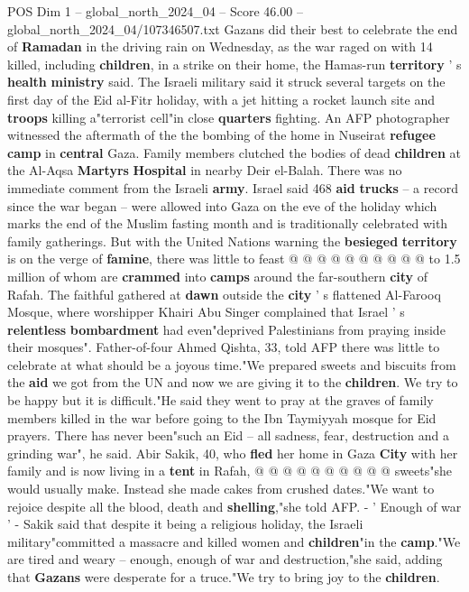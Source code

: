 \begin{textsample}{POS Dim 1 – global\_north\_2024\_04 – Score 46.00 – global\_north\_2024\_04/107346507.txt}  \label{ex:f1_pos_191}
Gazans did their best to celebrate the end of \textbf{Ramadan} in the driving rain on Wednesday, as the war raged on with 14 killed, including \textbf{children}, in a strike on their home, the Hamas-run \textbf{territory} ' s \textbf{health} \textbf{ministry} said.
The Israeli military said it struck several targets on the first day of the Eid al-Fitr holiday, with a jet hitting a rocket launch site and \textbf{troops} killing a"terrorist cell"in close \textbf{quarters} fighting.
An AFP photographer witnessed the aftermath of the the bombing of the home in Nuseirat \textbf{refugee} \textbf{camp} in \textbf{central} Gaza.
Family members clutched the bodies of dead \textbf{children} at the Al-Aqsa \textbf{Martyrs} \textbf{Hospital} in nearby Deir el-Balah.
There was no immediate comment from the Israeli \textbf{army}.
Israel said 468 \textbf{aid} \textbf{trucks} -- a record since the war began -- were allowed into Gaza on the eve of the holiday which marks the end of the Muslim fasting month and is traditionally celebrated with family gatherings.
But with the United Nations warning the \textbf{besieged} \textbf{territory} is on the verge of \textbf{famine}, there was little to feast @ @ @ @ @ @ @ @ @ @ to 1.5 million of whom are \textbf{crammed} into \textbf{camps} around the far-southern \textbf{city} of Rafah.
The faithful gathered at \textbf{dawn} outside the \textbf{city} ' s flattened Al-Farooq Mosque, where worshipper Khairi Abu Singer complained that Israel ' s \textbf{relentless} \textbf{bombardment} had even"deprived Palestinians from praying inside their mosques".
Father-of-four Ahmed Qishta, 33, told AFP there was little to celebrate at what should be a joyous time."We prepared sweets and biscuits from the \textbf{aid} we got from the UN and now we are giving it to the \textbf{children}.
We try to be happy but it is difficult."He said they went to pray at the graves of family members killed in the war before going to the Ibn Taymiyyah mosque for Eid prayers.
There has never been"such an Eid -- all sadness, fear, destruction and a grinding war", he said.
Abir Sakik, 40, who \textbf{fled} her home in Gaza \textbf{City} with her family and is now living in a \textbf{tent} in Rafah, @ @ @ @ @ @ @ @ @ @ sweets"she would usually make.
Instead she made cakes from crushed dates."We want to rejoice despite all the blood, death and \textbf{shelling},"she told AFP. - ' Enough of war ' - Sakik said that despite it being a religious holiday, the Israeli military"committed a massacre and killed women and \textbf{children}"in the \textbf{camp}."We are tired and weary -- enough, enough of war and destruction,"she said, adding that \textbf{Gazans} were desperate for a truce."We try to bring joy to the \textbf{children}.

\end{textsample}
